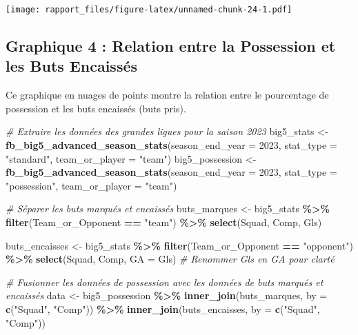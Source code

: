 \documentclass[
]{article}
\newenvironment{Shaded}{\begin{snugshade}}{\end{snugshade}}
\newcommand{\AttributeTok}[1]{\textcolor[rgb]{0.13,0.29,0.53}{#1}}
\newcommand{\CommentTok}[1]{\textcolor[rgb]{0.56,0.35,0.01}{\textit{#1}}}
\newcommand{\DecValTok}[1]{\textcolor[rgb]{0.00,0.00,0.81}{#1}}
\newcommand{\FunctionTok}[1]{\textcolor[rgb]{0.13,0.29,0.53}{\textbf{#1}}}
\newcommand{\NormalTok}[1]{#1}
\newcommand{\OtherTok}[1]{\textcolor[rgb]{0.56,0.35,0.01}{#1}}
\newcommand{\SpecialCharTok}[1]{\textcolor[rgb]{0.81,0.36,0.00}{\textbf{#1}}}
\newcommand{\StringTok}[1]{\textcolor[rgb]{0.31,0.60,0.02}{#1}}
\begin{document}
\texttt{[image: rapport\_files/figure-latex/unnamed-chunk-24-1.pdf]}

\subsection{Graphique 4 : Relation entre la Possession et les Buts
Encaissés}\label{graphique-4-relation-entre-la-possession-et-les-buts-encaissuxe9s}

Ce graphique en nuages de points montre la relation entre le pourcentage
de possession et les buts encaissés (buts pris).

\begin{Shaded}
\begin{Highlighting}[]
\CommentTok{\# Extraire les données des grandes ligues pour la saison 2023}
\NormalTok{big5\_stats }\OtherTok{\textless{}{-}} \FunctionTok{fb\_big5\_advanced\_season\_stats}\NormalTok{(}\AttributeTok{season\_end\_year =} \DecValTok{2023}\NormalTok{, }\AttributeTok{stat\_type =} \StringTok{"standard"}\NormalTok{, }\AttributeTok{team\_or\_player =} \StringTok{"team"}\NormalTok{)}
\NormalTok{big5\_possession }\OtherTok{\textless{}{-}} \FunctionTok{fb\_big5\_advanced\_season\_stats}\NormalTok{(}\AttributeTok{season\_end\_year =} \DecValTok{2023}\NormalTok{, }\AttributeTok{stat\_type =} \StringTok{"possession"}\NormalTok{, }\AttributeTok{team\_or\_player =} \StringTok{"team"}\NormalTok{)}

\CommentTok{\# Séparer les buts marqués et encaissés}
\NormalTok{buts\_marques }\OtherTok{\textless{}{-}}\NormalTok{ big5\_stats }\SpecialCharTok{\%\textgreater{}\%}
  \FunctionTok{filter}\NormalTok{(Team\_or\_Opponent }\SpecialCharTok{==} \StringTok{"team"}\NormalTok{) }\SpecialCharTok{\%\textgreater{}\%}
  \FunctionTok{select}\NormalTok{(Squad, Comp, Gls)}

\NormalTok{buts\_encaisses }\OtherTok{\textless{}{-}}\NormalTok{ big5\_stats }\SpecialCharTok{\%\textgreater{}\%}
  \FunctionTok{filter}\NormalTok{(Team\_or\_Opponent }\SpecialCharTok{==} \StringTok{"opponent"}\NormalTok{) }\SpecialCharTok{\%\textgreater{}\%}
  \FunctionTok{select}\NormalTok{(Squad, Comp, }\AttributeTok{GA =}\NormalTok{ Gls)  }\CommentTok{\# Renommer Gls en GA pour clarté}

\CommentTok{\# Fusionner les données de possession avec les données de buts marqués et encaissés}
\NormalTok{data }\OtherTok{\textless{}{-}}\NormalTok{ big5\_possession }\SpecialCharTok{\%\textgreater{}\%}
  \FunctionTok{inner\_join}\NormalTok{(buts\_marques, }\AttributeTok{by =} \FunctionTok{c}\NormalTok{(}\StringTok{"Squad"}\NormalTok{, }\StringTok{"Comp"}\NormalTok{)) }\SpecialCharTok{\%\textgreater{}\%}
  \FunctionTok{inner\_join}\NormalTok{(buts\_encaisses, }\AttributeTok{by =} \FunctionTok{c}\NormalTok{(}\StringTok{"Squad"}\NormalTok{, }\StringTok{"Comp"}\NormalTok{))}


\end{Highlighting}
\end{Shaded}
\end{document}
